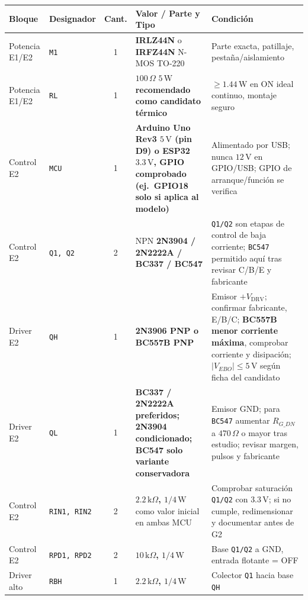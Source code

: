 \documentclass[10pt, a4paper, landscape]{article}
\begin{document}
\par\vspace{0.12cm}\noindent
\renewcommand{\arraystretch}{1.15}
{\footnotesize
\begin{tabularx}{\linewidth}{|>{\raggedright\arraybackslash}p{2.3cm}|>{\raggedright\arraybackslash}p{2.3cm}|c|>{\raggedright\arraybackslash}p{7.8cm}|>{\raggedright\arraybackslash}X|}
\hline
\rowcolor{ucbgray}
\textbf{Bloque} & \textbf{Designador} & \textbf{Cant.} & \textbf{Valor / Parte y Tipo} & \textbf{Condición} \\ \hline
Potencia E1/E2 & \texttt{M1} & 1 & \textbf{IRLZ44N} o \textbf{IRFZ44N} N-MOS TO-220 & Parte exacta, patillaje, pestaña/aislamiento \\ \hline
Potencia E1/E2 & \texttt{RL} & 1 & $100\,\Omega$ \textbf{$5\,\text{W}$ recomendado como candidato térmico} & $\ge 1.44\,\text{W}$ en ON ideal continuo, montaje seguro \\ \hline
Control E2 & \texttt{MCU} & 1 & \textbf{Arduino Uno Rev3 $5\,\text{V}$ (pin D9) o ESP32 $3.3\,\text{V}$, GPIO comprobado (ej.\ GPIO18 solo si aplica al modelo)} & Alimentado por USB; nunca $12\,\text{V}$ en GPIO/USB; GPIO de arranque/función se verifica \\ \hline
Control E2 & \texttt{Q1, Q2} & 2 & NPN \textbf{2N3904 / 2N2222A / BC337 / BC547} & \texttt{Q1/Q2} son etapas de control de baja corriente; \texttt{BC547} permitido aquí tras revisar C/B/E y fabricante \\ \hline
Driver E2 & \texttt{QH} & 1 & \textbf{2N3906 PNP o BC557B PNP} & Emisor $+V_{\text{DRV}}$; confirmar fabricante, E/B/C; \textbf{BC557B menor corriente máxima}, comprobar corriente y disipación; $|V_{EBO}| \le 5\,\text{V}$ según ficha del candidato \\ \hline
Driver E2 & \texttt{QL} & 1 & \textbf{BC337 / 2N2222A preferidos; 2N3904 condicionado; BC547 solo variante conservadora} & Emisor GND; para \texttt{BC547} aumentar $R_{G\_DN}$ a $470\,\Omega$ o mayor tras estudio; revisar margen, pulsos y fabricante \\ \hline
Control E2 & \texttt{RIN1, RIN2} & 2 & \textbf{$2.2\,\text{k}\Omega$, $1/4\,\text{W}$} como valor inicial en ambas MCU & Comprobar saturación \texttt{Q1/Q2} con $3.3\,\text{V}$; si no cumple, redimensionar y documentar antes de G2 \\ \hline
Control E2 & \texttt{RPD1, RPD2} & 2 & \textbf{$10\,\text{k}\Omega$, $1/4\,\text{W}$} & Base \texttt{Q1/Q2} a GND, entrada flotante = OFF \\ \hline
Driver alto & \texttt{RBH} & 1 & \textbf{$2.2\,\text{k}\Omega$, $1/4\,\text{W}$} & Colector \texttt{Q1} hacia base \texttt{QH} \\ \hline

\end{tabularx}}
\end{document}
